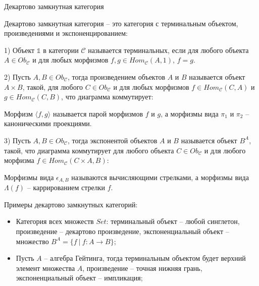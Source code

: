 \begin{defin} Декартово замкнутная категория

  Декартово замкнутная категория -- это категория с терминальным объектом, произведениями и экспоненцированием:

1) Объект $\mathds{1}$ в категории $\mathcal{C}$ называется терминальных, если для любого объекта $A \in Ob_{\mathcal{C}}$ и для любых морфизмов $f, g \in Hom_{\mathcal{C}}(A, 1)$, $f = g$.

2) Пусть $A, B \in Ob_{\mathcal{C}}$, тогда произведением объектов $A$ и $B$ называется объект $A \times B$, такой, для любого $C \in Ob_{\mathcal{C}}$ и для любых морфизмов $f \in Hom_{\mathcal{C}}(C, A)$ и $g \in Hom_{\mathcal{C}}(C, B)$,
что диаграмма коммутирует:


Морфизм $\langle f,g \rangle$ называется парой морфизмов $f$ и $g$, а морфизмы вида $\pi_1$ и $\pi_2$ -- каноническими проекциями.

3) Пусть $A, B \in Ob_{\mathcal{C}}$, тогда экспонентой объектов $A$ и $B$ называется объект $B^A$, такой, что диаграмма коммутирует для любого объекта $C \in Ob_{\mathcal{C}}$ и для любого морфизма $f \in Hom_{\mathcal{C}}(C \times A, B)$:


Морфизмы вида $\epsilon_{A,B}$ называются вычисляющими стрелками, а морфизмы вида $\Lambda(f)$ -- каррированием стрелки $f$.
\end{defin}

Примеры декартово замкнутных категорий:
\begin{itemize}
  \item Категория всех множеств $Set$: терминальный объект -- любой синглетон, произведение -- декартово произведение, экспоненциальный объект -- множество $B^A = \{ f \: | \: f : A \to B \}$;
  \item Пусть $A$ -- алгебра Гейтинга, тогда терминальным объектом будет верхний элемент множества $A$, произведение -- точная нижняя грань, экспоненциальный объект -- импликация;
\end{itemize}


